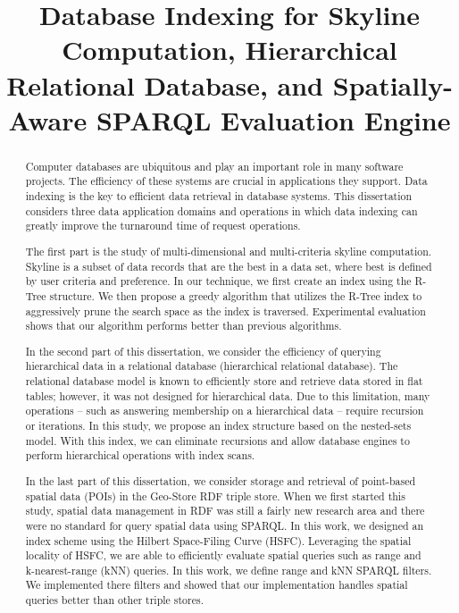 \documentclass[12pt]{report}
\title{Database Indexing for Skyline Computation, Hierarchical Relational Database, and Spatially-Aware SPARQL Evaluation Engine}
\begin{document}
\begin{romanpages}      %

\TitlePage 

\begin{abstract}
Computer databases are ubiquitous and play an important role in many software projects. The efficiency of these systems are crucial in applications they support. Data indexing is the key to efficient data retrieval in database systems. This dissertation considers three data application domains and operations in which data indexing can greatly improve the turnaround time of request operations.

The first part is the study of multi-dimensional and multi-criteria skyline computation. Skyline is a subset of data records that are the best in a data set, where best is defined by user criteria and preference. In our technique, we first create an index using the R-Tree structure. We then propose a greedy algorithm that utilizes the R-Tree index to aggressively prune the search space as the index is traversed. Experimental evaluation shows that our algorithm performs better than previous algorithms.

In the second part of this dissertation, we consider the efficiency of querying hierarchical data in a relational database (hierarchical relational database). The relational database model is known to efficiently store and retrieve data stored in flat tables; however, it was not designed for hierarchical data. Due to this limitation, many operations -- such as answering membership on a hierarchical data -- require recursion or iterations. In this study, we propose an index structure based on the nested-sets model. With this index, we can eliminate recursions and allow database engines to perform hierarchical operations with index scans.

In the last part of this dissertation, we consider storage and retrieval of point-based spatial data (POIs) in the Geo-Store RDF triple store. When we first started this study, spatial data management in RDF was still a fairly new research area and there were no standard for query spatial data using SPARQL. In this work, we designed an index scheme using the Hilbert Space-Filing Curve (HSFC). Leveraging the spatial locality of HSFC, we are able to efficiently evaluate spatial queries such as range and k-nearest-range (kNN) queries. In this work, we define range and kNN SPARQL filters. We implemented there filters and showed that our implementation handles spatial queries better than other triple stores.
\end{abstract}


\end{romanpages}
\end{document}
